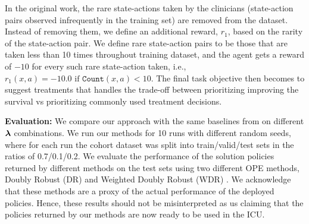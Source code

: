 In the original work, the rare state-actions taken by the clinicians (state-action pairs observed infrequently in the training set) are removed from the dataset. Instead of removing them,
we define an additional reward, $r_1$, based on the rarity of the state-action pair. We define rare state-action pairs to be those that are taken less than 10 times throughout training dataset, and the agent gets a reward of $-10$ for every such rare state-action taken, i.e.,  $r_1(x,a) = -10.0 \text{ if } \texttt{Count}(x,a) < 10$.
The final task objective then becomes to suggest treatments that handles the trade-off between prioritizing improving the survival vs prioritizing commonly used treatment decisions.


\textbf{Evaluation:} 
We compare our approach with the same baselines from  on different $\bm{\lambda}$ combinations.  
We run our methods for 10 runs with different random seeds, where for each run the cohort dataset was split into train/valid/test sets in the ratios of 0.7/0.1/0.2.
We evaluate the performance of the solution policies returned by different methods on the test sets using two different OPE methods, Doubly Robust (DR) \citep{jiang2015dependence} and Weighted Doubly Robust (WDR) \citep{thomas2016data}.
We acknowledge that these methods are a proxy of the actual performance of the deployed policies. Hence, these results should not be misinterpreted as us claiming that the policies returned by our methods are now ready to be used in the ICU. 


